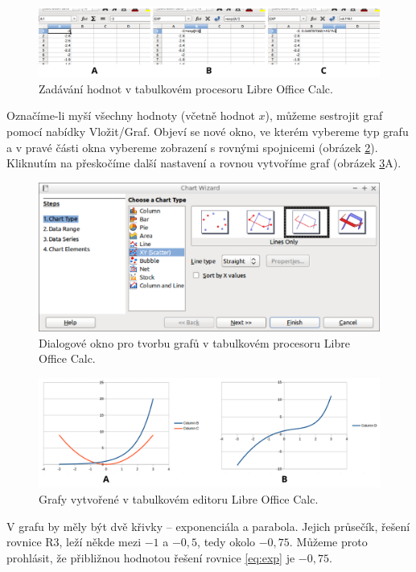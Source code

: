 \documentclass[a4paper,oneside,12pt]{article}
\begin{document}
\begin{figure}
\begin{center}
\includegraphics{./IMGS/screens-drawing.png}
\end{center}
\caption{Zadávání hodnot v tabulkovém procesoru Libre Office Calc.}
\label{fig:bunky}
\end{figure}
%
Označíme-li myší všechny hodnoty (včetně hodnot $x$), 
můžeme sestrojit graf pomocí nabídky Vložit/Graf. Objeví
se nové okno, ve kterém vybereme typ grafu  a
v pravé části okna vybereme zobrazení s rovnými spojnicemi
(obrázek \ref{fig:grafokno}). Kliknutím na
 přeskočíme další
nastavení a rovnou vytvoříme graf (obrázek \ref{fig:grafy}A).

\begin{figure}
\begin{center}
\includegraphics{./IMGS/grafokno-drawing.png}
\end{center}
\caption{Dialogové okno pro tvorbu grafů v tabulkovém procesoru
Libre Office Calc.}
\label{fig:grafokno}
\end{figure}

\begin{figure}
\begin{center}
\includegraphics{./IMGS/grafy-drawing.png}
\end{center}
\caption{Grafy vytvořené v tabulkovém editoru Libre Office Calc.}
\label{fig:grafy}
\end{figure}
%
V grafu by měly být dvě křivky -- exponenciála a parabola.
Jejich průsečík, řešení rovnice R3, leží někde mezi $-1$ a $-0,5$,
tedy okolo $-0,75$. Můžeme proto prohlásit, že přibližnou
hodnotou řešení rovnice \ref{eq:exp} je $-0,75$.
\end{document}
